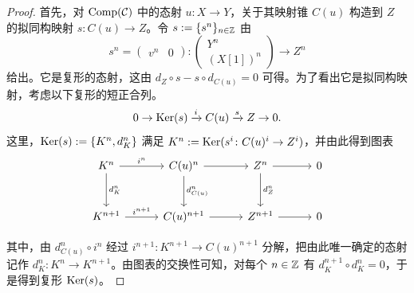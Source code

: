 \begin{proof}
首先，对 $\operatorname{Comp}(\mathcal{C})$ 中的态射 $u\colon X\to Y$，关于其映射锥 $C(u)$ 构造到 $Z$ 的拟同构映射 $s\colon C(u)\to Z$。令 $s:=\{s^n\}_{n\in\mathbb{Z}}$ 由
\begin{equation}
  s^n = \begin{pmatrix} v^n & 0 \end{pmatrix}\colon
  \begin{pmatrix} Y^n \\ (X[1])^n \end{pmatrix} \longrightarrow Z^n \tag{5.15}
\end{equation}
给出。它是复形的态射，这由 $d_Z\circ s-s\circ d_{C(u)}=0$ 可得。为了看出它是拟同构映射，考虑以下复形的短正合列。
\[
  0\to\operatorname{Ker}(s)\xrightarrow{i}C(u)\xrightarrow{s}Z\to 0.
\]
这里，$\operatorname{Ker}(s):=\{K^n,d_K^n\}$ 满足 $K^n:=\operatorname{Ker}(s^i\colon C(u)^i\to Z^i)$，并由此得到图表
\[\begin{tikzcd}[row sep=2.8em, column sep=3.0em]
K^n \arrow[r,"i^n"] \arrow[d,"d_K^n"] & C(u)^n \arrow[r] \arrow[d,"d_{C(u)}^n"] & Z^n \arrow[r] \arrow[d,"d_Z^n"] & 0 \\
K^{n+1} \arrow[r,"i^{n+1}"] & C(u)^{n+1} \arrow[r] & Z^{n+1} \arrow[r] & 0
\end{tikzcd}\]

其中，由 $d_{C(u)}^n\circ i^n$ 经过 $i^{n+1}\colon K^{n+1}\to C(u)^{n+1}$ 分解，把由此唯一确定的态射记作 $d_K^n\colon K^n\to K^{n+1}$。由图表的交换性可知，对每个 $n\in\mathbb{Z}$ 有 $d_K^{n+1}\circ d_K^n=0$，于是得到复形 $\operatorname{Ker}(s)$。


\end{proof}
